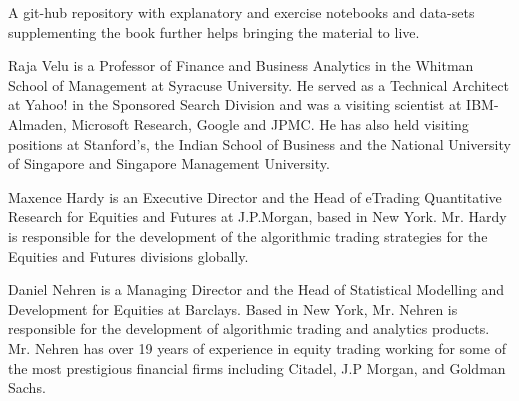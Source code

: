 \noindent A git-hub repository with explanatory and exercise notebooks and data-sets supplementing the book further helps bringing the material to live. \twomedskip


\noindent Raja Velu is a Professor of Finance and Business Analytics in the Whitman School of Management at Syracuse University. He served as a Technical Architect at Yahoo! in the Sponsored Search Division and was a visiting scientist at IBM-Almaden, Microsoft Research, Google and JPMC. He has also held visiting positions at Stanford's, the Indian School of Business and the National University of Singapore and Singapore Management University. \medskip

\noindent Maxence Hardy is an Executive Director and the Head of eTrading Quantitative Research for Equities and Futures at J.P.Morgan, based in New York. Mr. Hardy is responsible for the development of the algorithmic trading strategies for the Equities and Futures divisions globally. \medskip

\noindent Daniel Nehren is a Managing Director and the Head of Statistical Modelling and Development for Equities at Barclays. Based in New York, Mr. Nehren is responsible for the development of algorithmic trading and analytics products. Mr. Nehren has over 19 years of experience in equity trading working for some of the most prestigious financial firms including Citadel, J.P Morgan, and Goldman Sachs. 